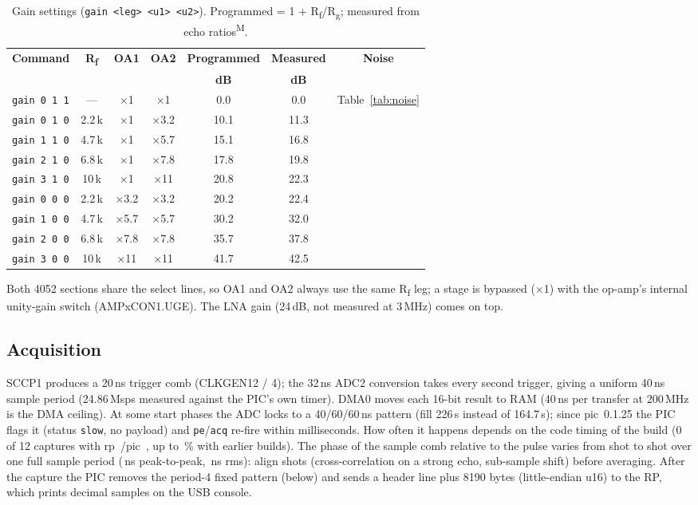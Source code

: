 \documentclass[10pt,a4paper]{article}
\newcommand{\us}{\,\textmu s}
\newcommand{\cmd}[1]{\texttt{#1}}
\newcommand{\meas}{\textsuperscript{M}}
\begin{document}
\begin{table}[H]\centering\small
\caption{Gain settings (\cmd{gain <leg> <u1> <u2>}). Programmed = 1 + R\textsubscript{f}/R\textsubscript{g}; measured from echo ratios\meas.}
\begin{tabular}{@{}lcccccc@{}}\toprule
\textbf{Command} & \textbf{R\textsubscript{f}} & \textbf{OA1} & \textbf{OA2} & \textbf{Programmed} & \textbf{Measured} & \textbf{Noise}\\
& & & & \textbf{dB} & \textbf{dB} & \\\midrule
\cmd{gain 0 1 1} & — & ×1 & ×1 & 0.0 & 0.0 & Table~\ref{tab:noise}\\
\cmd{gain 0 1 0} & 2.2\,k & ×1 & ×3.2 & 10.1 & 11.3 & \\
\cmd{gain 1 1 0} & 4.7\,k & ×1 & ×5.7 & 15.1 & 16.8 & \\
\cmd{gain 2 1 0} & 6.8\,k & ×1 & ×7.8 & 17.8 & 19.8 & \\
\cmd{gain 3 1 0} & 10\,k & ×1 & ×11 & 20.8 & 22.3 & \\
\cmd{gain 0 0 0} & 2.2\,k & ×3.2 & ×3.2 & 20.2 & 22.4 & \\
\cmd{gain 1 0 0} & 4.7\,k & ×5.7 & ×5.7 & 30.2 & 32.0 & \\
\cmd{gain 2 0 0} & 6.8\,k & ×7.8 & ×7.8 & 35.7 & 37.8 & \\
\cmd{gain 3 0 0} & 10\,k & ×11 & ×11 & 41.7 & 42.5 & \\\bottomrule
\end{tabular}\end{table}
Both 4052 sections share the select lines, so OA1 and OA2 always use the same R\textsubscript{f} leg; a stage is bypassed (×1) with the
op-amp's internal unity-gain switch (AMPxCON1.UGE). The LNA gain (24\,dB, not measured at 3\,MHz) comes on top.

\subsection{Acquisition}
SCCP1 produces a 20\,ns trigger comb (CLKGEN12 / 4); the 32\,ns ADC2 conversion takes every second trigger, giving a uniform
40\,ns sample period (24.86\,Msps measured against the PIC's own timer). DMA0 moves each 16-bit result to RAM (40\,ns per transfer at
200\,MHz is the DMA ceiling). At some start phases the ADC locks to a 40/60/60\,ns pattern (fill 226\us{} instead of 164.7\us);
since pic~0.1.25 the PIC flags it (status \cmd{slow}, no payload) and \cmd{pe}/\cmd{acq} re-fire within milliseconds. How often it happens depends
on the code timing of the build (0 of 12 captures with rp~\vrpfw/pic~\vpicfw, up to \vretryrate\,\% with earlier builds).
The phase of the sample comb relative to the pulse varies from shot to shot over one full sample period (\vjitspan\,ns
peak-to-peak, \vjitter\,ns rms): align shots (cross-correlation on a strong echo, sub-sample shift) before averaging.
After the capture the PIC removes the period-4 fixed pattern (below) and sends a header line plus 8190 bytes (little-endian u16)
to the RP, which prints decimal samples on the USB console.
\end{document}
